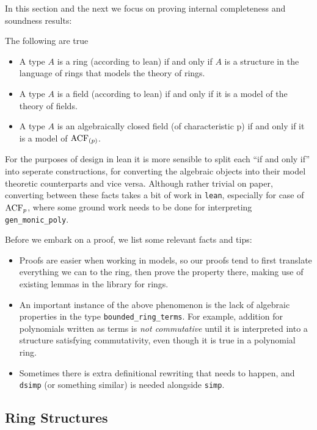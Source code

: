 In this section and the next we focus on proving internal
completeness and soundness results:
\begin{prop}
  The following are true
  \begin{itemize}
    \item A type $A$ is a ring (according to lean) if and only if
          $A$ is a structure in the language of rings
          that models the theory of rings.
    \item A type $A$ is a field (according to lean) if and only if
          it is a model of the theory of fields.
    \item A type $A$ is an algebraically closed field (of characteristic p)
          if and only if it is a model of $\operatorname{ACF}_{(p)}$.
  \end{itemize}
  For the purposes of design in lean it is
  more sensible to split each ``if and only if'' into seperate constructions,
  for converting the algebraic objects into their model theoretic counterparts
  and vice versa.
  Although rather trivial on paper,
  converting between these facts takes a bit of work in \texttt{lean},
  especially for case of $\operatorname{ACF}_{p}$,
  where some ground work needs to be done for interpreting \texttt{gen\_monic\_poly}.
\end{prop}

Before we embark on a proof, we list some relevant facts and tips:
\begin{itemize}
  \item Proofs are easier when working in models, so our proofs tend to
        first translate everything we can to the ring,
        then prove the property there,
        making use of existing lemmas in the library for rings.
  \item An important instance of the above phenomenon is the lack
        of algebraic properties in the type \texttt{bounded\_ring\_terms}.
        For example, addition for polynomials written as terms
        is \textit{not commutative} until it is interpreted into a structure
        satisfying commutativity,
        even though it is true in a polynomial ring.
  \item Sometimes there is extra definitional rewriting that needs to happen,
        and \texttt{dsimp} (or something similar) is needed alongside \texttt{simp}.
\end{itemize}

\subsection{Ring Structures}

